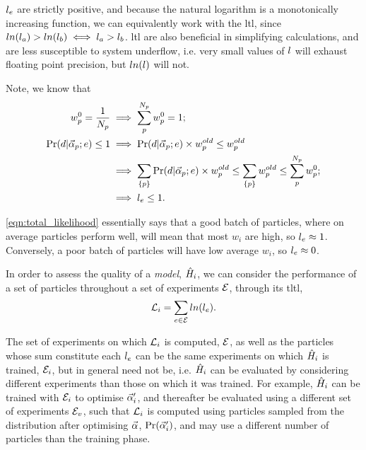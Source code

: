 $l_{e}$ are strictly positive, and because the natural logarithm is a monotonically increasing function, 
    we can equivalently work with the \gls{ltl}, 
    since $ln(l_a) > ln(l_b) \iff l_a > l_b$. 
\gls{ltl} are also beneficial in simplifying calculations, 
    and are less susceptible to system underflow, 
    i.e. very small values of $l$ will exhaust floating point precision, 
    but $ln(l)$ will not. 
\par 

Note, we know that
\begin{align}    
    \begin{split}
        w_p^0 = \frac{1}{N_p} & \implies \sum_p^{N_p} w_p^0 = 1 ; \\
        \Pr(d | \vec{\alpha}_p; e) \leq 1 & \implies \Pr(d | \vec{\alpha}_p; e) \times w_p^{old} \leq w_p^{old} \\
        & \implies \sum\limits_{\{p\}} \Pr(d | \vec{\alpha}_p; e) \times w_p^{old} \leq \sum\limits_{\{p\}} w_p^{old} \leq \sum_p^{N_p} w_p^0; \\
        & \implies l_{e} \leq 1.
    \end{split}
\end{align}

\cref{eqn:total_likelihood} essentially says that a good batch of particles, 
    where on average particles perform well, 
    will mean that most $w_i$ are high, so $l_{e} \approx 1$. 
Conversely, a poor batch of particles will have low average $w_i$, so $l_{e} \approx 0$. 
\par

In order to assess the quality of a \emph{model}, $\hat{H}_i$, 
    we can consider the performance of a set of particles throughout a set of experiments ${ \mathcal{E} }$, 
    through its \gls{tltl}, 
\begin{equation}
    \label{eqn:log_total_likelihood}
    {\mathcal{L}}_{i} = \sum\limits_{e \in { \mathcal{E} }} ln(l_{e}).    
\end{equation}

The set of experiments on which ${\mathcal{L}}_{i}$ is computed, ${ \mathcal{E} }$, 
    as well as the particles whose sum constitute each $l_{e}$
    can be the same experiments on which $\hat{H}_i$ is trained, ${ \mathcal{E} }_i$, but in general need not be, 
    i.e. $\hat{H}_i$ can be evaluated by considering different experiments than those on which it was trained.
For example, $\hat{H}_i$ can be trained with ${ \mathcal{E} }_i$ to optimise $\vec{\alpha}_i^{\prime}$, 
    and thereafter be evaluated using a different set of experiments ${ \mathcal{E} }_v$, 
    such that ${\mathcal{L}}_{i}$ is computed using particles sampled from the distribution after optimising $\vec{\alpha}$, 
    $\Pr(\vec{\alpha}_i^{\prime})$, and may use a different number of particles than the training phase. 

